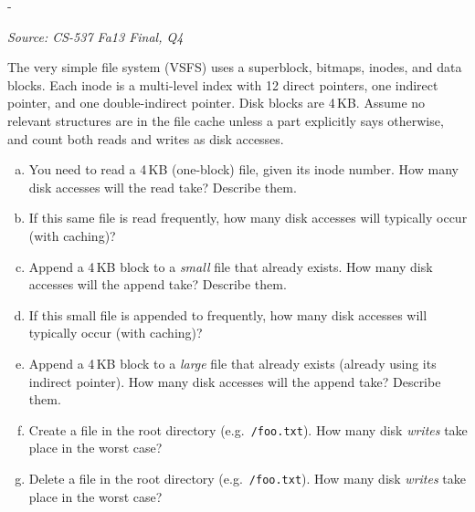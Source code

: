 \documentclass[11pt,a4paper]{article}
\makeatletter
\newcommand{\keepspace}[1]{\par\penalty-100\begingroup
  \setlength{\dimen@}{#1}\dimen@ii\pagegoal\advance\dimen@ii-\pagetotal
  \ifdim\dimen@>\dimen@ii\ifdim\dimen@ii>\z@\vfil\fi\break\fi\endgroup}
\newcounter{qn}[section]
\newenvironment{Qn}[4]{%
  \refstepcounter{qn}\keepspace{7\baselineskip}%
  \begin{tcolorbox}[qboxstyle, title={Q\thesection.\theqn\ \ [#1 \textbar\ #2]\ \ #4}]%
  {\footnotesize\color{g3}\textit{Source: #3}}\par\smallskip%
}{%
  \end{tcolorbox}%
}
\makeatother
\begin{document}
\begin{Qn}{Hard}{Lect 24}{CS-537 Fa13 Final, Q4}{VSFS access-path I/O counts for read, append, create, unlink}
The very simple file system (VSFS) uses a superblock, bitmaps, inodes, and
data blocks. Each inode is a multi-level index with 12 direct pointers, one
indirect pointer, and one double-indirect pointer. Disk blocks are 4\,KB.
Assume no relevant structures are in the file cache unless a part explicitly
says otherwise, and count both reads and writes as disk accesses.
\begin{enumerate}[(a)]
\item You need to read a 4\,KB (one-block) file, given its inode number.
      How many disk accesses will the read take? Describe them.
\item If this same file is read frequently, how many disk accesses will
      typically occur (with caching)?
\item Append a 4\,KB block to a \emph{small} file that already exists.
      How many disk accesses will the append take? Describe them.
\item If this small file is appended to frequently, how many disk accesses
      will typically occur (with caching)?
\item Append a 4\,KB block to a \emph{large} file that already exists
      (already using its indirect pointer). How many disk accesses will
      the append take? Describe them.
\item Create a file in the root directory (e.g.\ \texttt{/foo.txt}).
      How many disk \emph{writes} take place in the worst case?
\item Delete a file in the root directory (e.g.\ \texttt{/foo.txt}).
      How many disk \emph{writes} take place in the worst case?
\end{enumerate}
\end{Qn}
\end{document}
